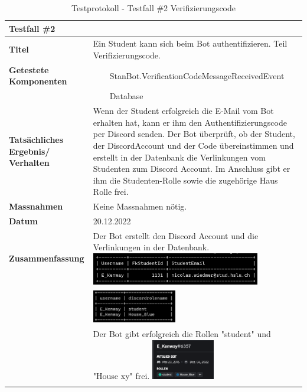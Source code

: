 \documentclass[a4paper, table]{article}
\newcommand{\tabitem}{~~\llap{\textbullet}~~}
\begin{document}
\begin{longtable}[h]{|p{9em}|p{31em}|}
    \hline
    \multicolumn{2}{|l|}{\textbf{Testfall \#2}} \\
    \hline
    \textbf{Titel} & Ein Student kann sich beim Bot authentifizieren. Teil Verifizierungscode. \\
    \hline
    \textbf{Getestete Komponenten} &  
        \tabitem StanBot.VerificationCodeMessageReceivedEvent \\*
     &  \tabitem Database \\
    \hline
    \textbf{Tatsächliches Ergebnis/ Verhalten} &  
        Wenn der Student erfolgreich die E-Mail vom Bot erhalten hat, kann er ihm den Authentifizierungscode per Discord senden. 
        Der Bot überprüft, ob der Student, der DiscordAccount und der Code übereinstimmen und erstellt in der Datenbank die Verlinkungen vom Studenten zum Discord Account. 
        Im Anschluss gibt er ihm die Studenten-Rolle sowie die zugehörige Haus Rolle frei. \\
    \hline
    \textbf{Massnahmen} & Keine Massnahmen nötig. \\
    \hline
    \textbf{Datum} & 20.12.2022 \\
    \hline
    \textbf{Zusammenfassung} & 
        Der Bot erstellt den Discord Account und die Verlinkungen in der Datenbank. 
        \includegraphics[width=0.8\textwidth]{img/Tests/2_Test_dbAccountStudent.png} \\*
      & \includegraphics[width=0.4\textwidth]{img/Tests/2_Test_dbAccountRoles.png} \\*
      & Der Bot gibt erfolgreich die Rollen "student" und "House xy" frei. 
        \includegraphics[width=0.3\textwidth]{img/Tests/2_Test_discordRole.png} \\
    \hline
    \caption{Testprotokoll - Testfall \#2 Verifizierungscode}
\end{longtable}
\end{document}

